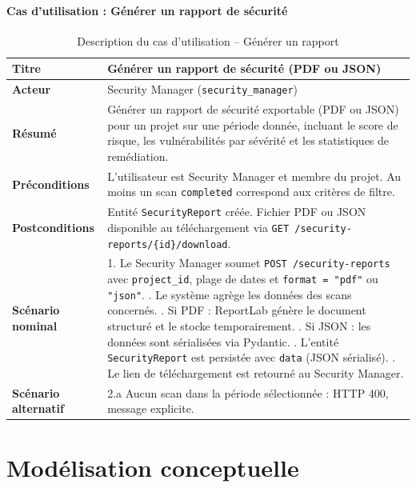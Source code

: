 \paragraph{Cas d'utilisation : Générer un rapport de sécurité}
\begin{table}[H]
\centering
\caption{Description du cas d'utilisation -- Générer un rapport}
\label{tab:uc-report}
\small
\renewcommand{\arraystretch}{1.3}
\begin{tabularx}{\textwidth}{>{\bfseries}p{3.5cm} X}
\hline
Titre & Générer un rapport de sécurité (PDF ou JSON) \\
\hline
Acteur & Security Manager (\texttt{security\_manager}) \\
\hline
Résumé & Générer un rapport de sécurité exportable (PDF ou JSON) pour un projet sur une période donnée, incluant le score de risque, les vulnérabilités par sévérité et les statistiques de remédiation. \\
\hline
Préconditions & L'utilisateur est Security Manager et membre du projet. Au moins un scan \texttt{completed} correspond aux critères de filtre. \\
\hline
Postconditions & Entité \texttt{SecurityReport} créée. Fichier PDF ou JSON disponible au téléchargement via \texttt{GET /security-reports/\{id\}/download}. \\
\hline
Scénario nominal &
1. Le Security Manager soumet \texttt{POST /security-reports} avec \texttt{project\_id}, plage de dates et \texttt{format = "pdf"} ou \texttt{"json"}. \newline
2. Le système agrège les données des scans concernés. \newline
3. Si PDF : ReportLab génère le document structuré et le stocke temporairement. \newline
4. Si JSON : les données sont sérialisées via Pydantic. \newline
5. L'entité \texttt{SecurityReport} est persistée avec \texttt{data} (JSON sérialisé). \newline
6. Le lien de téléchargement est retourné au Security Manager. \\
\hline
Scénario alternatif &
2.a Aucun scan dans la période sélectionnée : HTTP 400, message explicite. \\
\hline
\end{tabularx}
\end{table}

\section{Modélisation conceptuelle}

